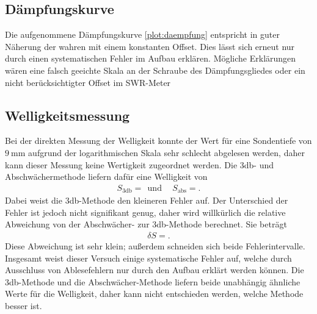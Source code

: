 \subsection{Dämpfungskurve}
Die aufgenommene Dämpfungskurve \ref{plot:daempfung} entspricht in guter Näherung der wahren mit einem konstanten Offset.
Dies lässt sich erneut nur durch einen systematischen Fehler im Aufbau erklären.
Mögliche Erklärungen wären eine falsch geeichte Skala an der Schraube des Dämpfungsgliedes oder ein nicht berücksichtigter Offset im SWR-Meter
\subsection{Welligkeitsmessung}
Bei der direkten Messung der Welligkeit konnte der Wert für eine Sondentiefe von $\SI{9}{\milli\meter}$ aufgrund der logarithmischen Skala sehr schlecht abgelesen werden, daher kann dieser Messung keine Wertigkeit zugeordnet werden.
Die 3db- und Abschwächermethode liefern dafür eine Welligkeit von
\begin{align*}
  S_{3\text{db}} =  \:\: \text{und}& \:\: S_\text{abs} = .
\end{align*}
Dabei weist die 3db-Methode den kleineren Fehler auf.
Der Unterschied der Fehler ist jedoch nicht signifikant genug, daher wird willkürlich die relative Abweichung von der Abschwächer- zur 3db-Methode berechnet.
Sie beträgt
\begin{align*}
  \delta S = .
\end{align*}
Diese Abweichung ist sehr klein; außerdem schneiden sich beide Fehlerintervalle.\\
Insgesamt weist dieser Versuch einige systematische Fehler auf, welche durch Ausschluss von Ablesefehlern nur durch den Aufbau erklärt werden können.
Die 3db-Methode und die Abschwächer-Methode liefern beide unabhängig ähnliche Werte für die Welligkeit, daher kann nicht entschieden werden, welche Methode besser ist.
